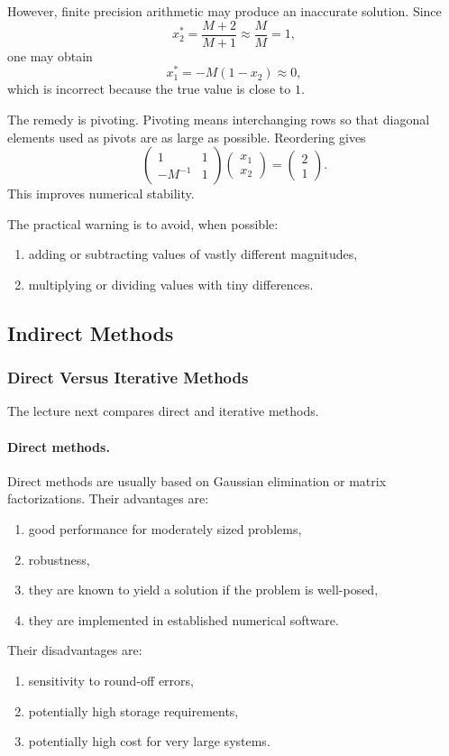 \documentclass[10pt, letterpaper]{article}
\begin{document}
However, finite precision arithmetic may produce an inaccurate solution. Since
\[
x_2^\ast
=
\frac{M+2}{M+1}
\approx
\frac{M}{M}
=
1,
\]
one may obtain
\[
x_1^\ast=-M(1-x_2)\approx 0,
\]
which is incorrect because the true value is close to \(1\).

The remedy is pivoting. Pivoting means interchanging rows so that diagonal elements used as pivots are as large as possible. Reordering gives
\[
\begin{pmatrix}
1 & 1\\
-M^{-1} & 1
\end{pmatrix}
\begin{pmatrix}
x_1\\
x_2
\end{pmatrix}
=
\begin{pmatrix}
2\\
1
\end{pmatrix}.
\]
This improves numerical stability.

The practical warning is to avoid, when possible:
\begin{enumerate}
    \item adding or subtracting values of vastly different magnitudes,
    \item multiplying or dividing values with tiny differences.
\end{enumerate}



\pagebreak


\subsection{Indirect Methods}

\subsubsection{Direct Versus Iterative Methods}

The lecture next compares direct and iterative methods.

\paragraph{Direct methods.}
Direct methods are usually based on Gaussian elimination or matrix factorizations. Their advantages are:
\begin{enumerate}
    \item good performance for moderately sized problems,
    \item robustness,
    \item they are known to yield a solution if the problem is well-posed,
    \item they are implemented in established numerical software.
\end{enumerate}
Their disadvantages are:
\begin{enumerate}
    \item sensitivity to round-off errors,
    \item potentially high storage requirements,
    \item potentially high cost for very large systems.
\end{enumerate}
\end{document}
